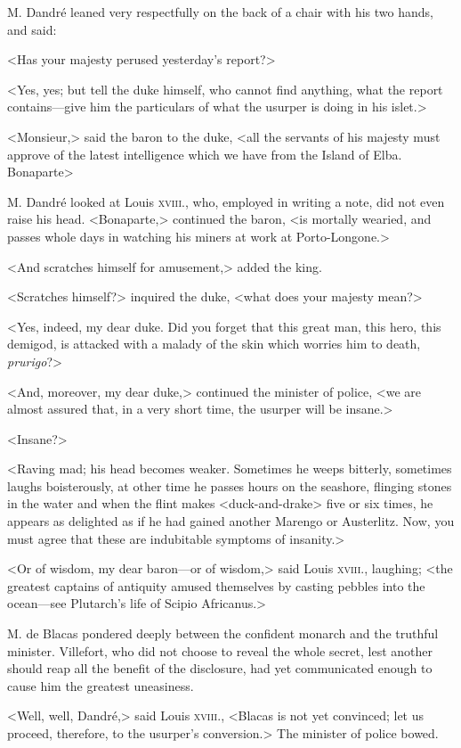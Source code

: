  M. Dandré leaned very respectfully on the back of a chair with his two hands, and said: 

 <Has your majesty perused yesterday's report?> 

 <Yes, yes; but tell the duke himself, who cannot find anything, what the report contains—give him the particulars of what the usurper is doing in his islet.> 

 <Monsieur,> said the baron to the duke, <all the servants of his majesty must approve of the latest intelligence which we have from the Island of Elba. Bonaparte\longdash> 

 M. Dandré looked at Louis \textsc{xviii.}, who, employed in writing a note, did not even raise his head. <Bonaparte,> continued the baron, <is mortally wearied, and passes whole days in watching his miners at work at Porto-Longone.> 

 <And scratches himself for amusement,> added the king. 

 <Scratches himself?> inquired the duke, <what does your majesty mean?> 

 <Yes, indeed, my dear duke. Did you forget that this great man, this hero, this demigod, is attacked with a malady of the skin which worries him to death, \textit{prurigo}?> 

 <And, moreover, my dear duke,> continued the minister of police, <we are almost assured that, in a very short time, the usurper will be insane.> 

 <Insane?> 

 <Raving mad; his head becomes weaker. Sometimes he weeps bitterly, sometimes laughs boisterously, at other time he passes hours on the seashore, flinging stones in the water and when the flint makes <duck-and-drake> five or six times, he appears as delighted as if he had gained another Marengo or Austerlitz. Now, you must agree that these are indubitable symptoms of insanity.> 

 <Or of wisdom, my dear baron—or of wisdom,> said Louis \textsc{xviii.}, laughing; <the greatest captains of antiquity amused themselves by casting pebbles into the ocean—see Plutarch's life of Scipio Africanus.> 

 M. de Blacas pondered deeply between the confident monarch and the truthful minister. Villefort, who did not choose to reveal the whole secret, lest another should reap all the benefit of the disclosure, had yet communicated enough to cause him the greatest uneasiness. 

 <Well, well, Dandré,> said Louis \textsc{xviii.}, <Blacas is not yet convinced; let us proceed, therefore, to the usurper's conversion.> The minister of police bowed. 


